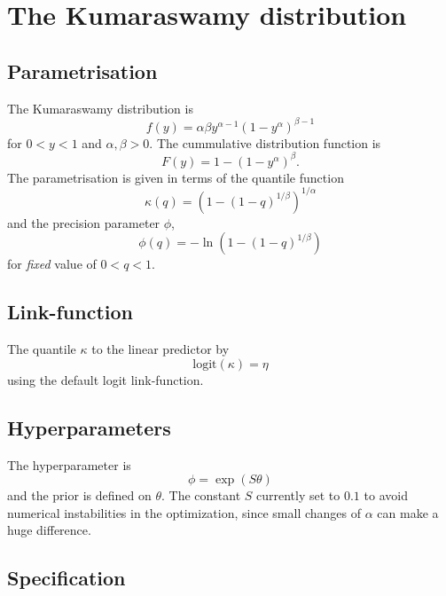 \documentclass[a4paper,11pt]{article}
\begin{document}
\section*{The Kumaraswamy distribution}

\subsection*{Parametrisation}

The Kumaraswamy distribution is
\begin{displaymath}
    f(y) = \alpha \beta y^{\alpha-1}(1-y^{\alpha})^{\beta-1}
\end{displaymath}
for $0<y<1$ and $\alpha, \beta > 0$. The cummulative distribution
function is
\begin{displaymath}
    F(y) = 1-(1-y^{\alpha})^{\beta}.
\end{displaymath}
The parametrisation is given in terms of the quantile function
\begin{displaymath}
    \kappa(q) = \left(1-(1-q)^{1/\beta}\right)^{1/\alpha}
\end{displaymath}
and the precision parameter $\phi$,
\begin{displaymath}
    \phi(q) = -\ln\left(1-(1-q)^{1/\beta}\right)
\end{displaymath}
for \emph{fixed} value of $0<q<1$.

\subsection*{Link-function}

The quantile $\kappa$ to the linear predictor by
\begin{displaymath}
    \text{logit}(\kappa) = \eta
\end{displaymath}
using the default logit link-function. 

\subsection*{Hyperparameters}

The hyperparameter is
\begin{displaymath}
    \phi = \exp(S \theta)
\end{displaymath}
and the prior is defined on $\theta$. The constant $S$ currently set
to $0.1$ to avoid numerical instabilities in the optimization, since
small changes of $\alpha$ can make a huge difference.


\subsection*{Specification}
\end{document}
